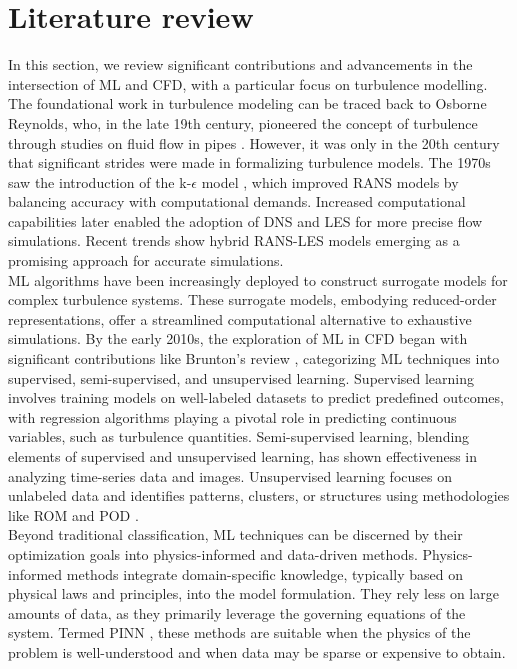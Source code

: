 \section{Literature review}
In this section, we review significant contributions and advancements in the intersection of ML and CFD, with a particular focus on turbulence modelling. The foundational work in turbulence modeling can be traced back to Osborne Reynolds, who, in the late 19th century, pioneered the concept of turbulence through studies on fluid flow in pipes \cite{reynolds1895dynamical}. However, it was only in the 20th century that significant strides were made in formalizing turbulence models. The 1970s saw the introduction of the k-$\epsilon$ model \cite{launder1974application}, which improved RANS models by balancing accuracy with computational demands. Increased computational capabilities later enabled the adoption of DNS and \gls{LES} \cite{smagorinsky1963general} for more precise flow simulations. Recent trends show hybrid RANS-LES models emerging as a promising approach for accurate simulations.\\
ML algorithms have been increasingly deployed to construct surrogate models for complex turbulence systems. These surrogate models, embodying reduced-order representations, offer a streamlined computational alternative to exhaustive simulations. By the early 2010s, the exploration of ML in CFD began with significant contributions like Brunton's review \cite{brunton}, categorizing ML techniques into supervised, semi-supervised, and unsupervised learning. Supervised learning involves training models on well-labeled datasets to predict predefined outcomes, with regression algorithms playing a pivotal role in predicting continuous variables, such as turbulence quantities. Semi-supervised learning, blending elements of supervised and unsupervised learning, has shown effectiveness in analyzing time-series data and images. Unsupervised learning focuses on unlabeled data and identifies patterns, clusters, or structures using methodologies like ROM and POD \cite{berkooz1993proper}.\\
Beyond traditional classification, ML techniques can be discerned by their optimization goals into physics-informed and data-driven methods. Physics-informed methods integrate domain-specific knowledge, typically based on physical laws and principles, into the model formulation. They rely less on large amounts of data, as they primarily leverage the governing equations of the system. Termed \gls{PINN} \cite{raissi2019physics}, these methods are suitable when the physics of the problem is well-understood and when data may be sparse or expensive to obtain. \\
